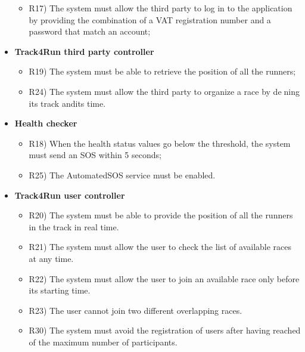 \begin{itemize}
\begin{itemize}
			\item R17) The system must allow the third party to log in to the application by providing the combination of a VAT registration number and a password that match an account;\\
		\end{itemize}
		\item \textbf{Track4Run third party controller}
		\begin{itemize}
			\item R19) The system must be able to retrieve the position of all the runners;\\
			\item R24) The system must allow the third party to organize a race by dening its track andits time.\\
		\end{itemize}
		\item \textbf{Health checker}
		\begin{itemize}
			\item R18) When the health status values go below the threshold, the system must send an SOS within 5 seconds;\\
			\item R25) The AutomatedSOS service must be enabled.\\
		\end{itemize}
		\item \textbf{Track4Run user controller}
		\begin{itemize}
			\item R20) The system must be able to provide the position of all the runners in the track in real time.\\
			\item R21) The system must allow the user to check the list of available races at any time.\\
			\item R22) The system must allow the user to join an available race only before its starting time.\\
			\item R23) The user cannot join two different overlapping races.\\
			\item R30) The system must avoid the registration of users after having reached of the maximum number of participants.\\
		\end{itemize}
	\end{itemize}
	
